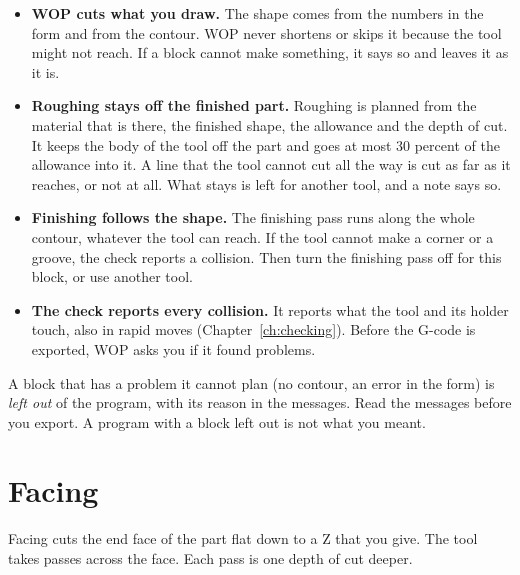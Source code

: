 \begin{itemize}
\item \textbf{WOP cuts what you draw.} The shape comes from the numbers in the form and from the contour. WOP never shortens or skips it because the tool might not reach. If a block cannot make something, it says so and leaves it as it is.
\item \textbf{Roughing stays off the finished part.} Roughing is planned from the material that is there, the finished shape, the allowance and the depth of cut. It keeps the body of the tool off the part and goes at most 30 percent of the allowance into it. A line that the tool cannot cut all the way is cut as far as it reaches, or not at all. What stays is left for another tool, and a note says so.
\item \textbf{Finishing follows the shape.} The finishing pass runs along the whole contour, whatever the tool can reach. If the tool cannot make a corner or a groove, the check reports a collision. Then turn the finishing pass off for this block, or use another tool.
\item \textbf{The check reports every collision.} It reports what the tool and its holder touch, also in rapid moves (Chapter~\ref{ch:checking}). Before the G-code is exported, WOP asks you if it found problems.
\end{itemize}

\begin{warningbox}
A block that has a problem it cannot plan (no contour, an error in the form) is \emph{left out} of the program, with its reason in the messages. Read the messages before you export. A program with a block left out is not what you meant.
\end{warningbox}

\section{Facing}\label{sec:blocks:facing}


Facing cuts the end face of the part flat down to a Z that you give. The tool takes passes across the face. Each pass is one depth of cut deeper.

